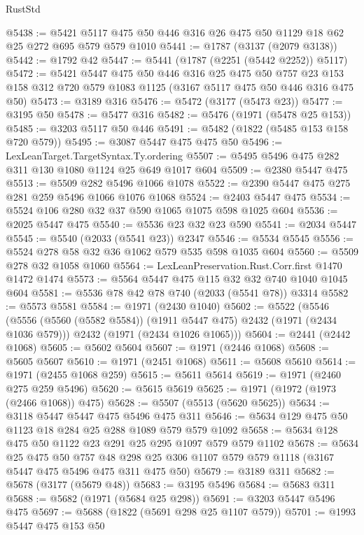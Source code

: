 \begin{lexlean}{RustStd}
\begin{coremodule}
@5438 := @5421 @5117 @475 @50 @446 @316 @26 @475 @50 @1129 @18 @62 @25 @272 @695 @579 @579 @1010
@5441 := @1787 (@3137 (@2079 @3138))
@5442 := @1792 @42
@5447 := @5441 (@1787 (@2251 (@5442 @2252)) @5117)
@5472 := @5421
    @5447
    @475
    @50
    @446
    @316
    @25
    @475
    @50
    @757
    @23
    @153
    @158
    @312
    @720
    @579
    @1083
    @1125
    (@3167 @5117 @475 @50 @446 @316 @475 @50)
@5473 := @3189 @316
@5476 := @5472 (@3177 (@5473 @23))
@5477 := @3195 @50
@5478 := @5477 @316
@5482 := @5476 (@1971 (@5478 @25 @153))
@5485 := @3203 @5117 @50 @446
@5491 := @5482 (@1822 (@5485 @153 @158 @720 @579))
@5495 := @3087 @5447 @475 @475 @50
@5496 := LexLeanTarget.TargetSyntax.Ty.ordering
@5507 := @5495 @5496 @475 @282 @311 @130 @1080 @1124 @25 @649 @1017 @604
@5509 := @2380 @5447 @475
@5513 := @5509 @282 @5496 @1066 @1078
@5522 := @2390 @5447 @475 @275 @281 @259 @5496 @1066 @1076 @1068
@5524 := @2403 @5447 @475
@5534 := @5524 @106 @280 @32 @37 @590 @1065 @1075 @598 @1025 @604
@5536 := @2025 @5447 @475
@5540 := @5536 @23 @32 @23 @590
@5541 := @2034 @5447
@5545 := @5540 (@2033 (@5541 @23)) @2347
@5546 := @5534 @5545
@5556 := @5524 @278 @58 @32 @36 @1062 @579 @535 @598 @1035 @604
@5560 := @5509 @278 @32 @1058 @1060
@5564 := LexLeanPreservation.Rust.Corr.first @1470 @1472 @1474
@5573 := @5564 @5447 @475 @115 @32 @32 @740 @1040 @1045 @604
@5581 := @5536 @78 @42 @78 @740 (@2033 (@5541 @78)) @3314
@5582 := @5573 @5581
@5584 := @1971 (@2430 @1040)
@5602 := @5522
    (@5546
      (@5556 (@5560 (@5582 @5584)) (@1911 @5447 @475) @2432 (@1971 (@2434 @1036 @579)))
      @2432
      (@1971 (@2434 @1026 @1065)))
@5604 := @2441 (@2442 @1068)
@5605 := @5602 @5604
@5607 := @1971 (@2446 @1068)
@5608 := @5605 @5607
@5610 := @1971 (@2451 @1068)
@5611 := @5608 @5610
@5614 := @1971 (@2455 @1068 @259)
@5615 := @5611 @5614
@5619 := @1971 (@2460 @275 @259 @5496)
@5620 := @5615 @5619
@5625 := @1971 (@1972 (@1973 (@2466 @1068)) @475)
@5628 := @5507 (@5513 (@5620 @5625))
@5634 := @3118 @5447 @5447 @475 @5496 @475 @311
@5646 := @5634 @129 @475 @50 @1123 @18 @284 @25 @288 @1089 @579 @579 @1092
@5658 := @5634 @128 @475 @50 @1122 @23 @291 @25 @295 @1097 @579 @579 @1102
@5678 := @5634
    @25
    @475
    @50
    @757
    @48
    @298
    @25
    @306
    @1107
    @579
    @579
    @1118
    (@3167 @5447 @475 @5496 @475 @311 @475 @50)
@5679 := @3189 @311
@5682 := @5678 (@3177 (@5679 @48))
@5683 := @3195 @5496
@5684 := @5683 @311
@5688 := @5682 (@1971 (@5684 @25 @298))
@5691 := @3203 @5447 @5496 @475
@5697 := @5688 (@1822 (@5691 @298 @25 @1107 @579))
@5701 := @1993 @5447 @475 @153 @50

\end{coremodule}
\end{lexlean}
